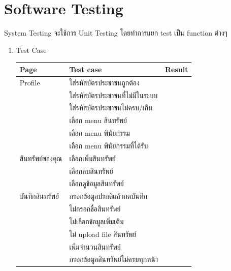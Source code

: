 \documentclass[12pt,oneside,openright,a4paper]{cpe-thai-project}
\begin{document}
\section{Software Testing}
\tab System Testing จะใช้การ Unit Testing โดยทำการแยก test เป็น function ต่างๆ
\begin{enumerate}[label=\thesection.\arabic*,leftmargin=0pt,itemindent=1.25cm]
\item Test Case
\begin{table}[h]
\begin{tabular}{|l|l|l|}
\hline
Page                   & Test case                                        &  Result \\ \hline
Profile                & ใส่รหัสบัตรประชาชนถูกต้อง                        &        \\ \hline
                       & ใส่รหัสบัตรประชาชนที่ไม่มีในระบบ                 &        \\ \hline
                       & ใส่รหัสบัตรประชาชนไม่ครบ/เกิน                    &        \\ \hline
                       & เลือก menu สินทรัพย์                             &        \\ \hline
                       & เลือก menu พินัยกรรม                             &        \\ \hline
                       & เลือก menu พินัยกรรมที่ได้รับ                    &        \\ \hline
สินทรัพย์ของคุณ        & เลือกเพิ่มสินทรัพย์                              &        \\ \hline
                       & เลือกลบสินทรัพย์                                 &        \\ \hline
                       & เลือกดูข้อมูลสินทรัพย์                           &        \\ \hline
บันทึกสินทรัพย์        & กรอกข้อมูลปรกติแล้วกดบันทึก                      &        \\ \hline
                       & ไม่กรอกชื่อสินทรัพย์                             &        \\ \hline
                       & ไม่เลือกข้อมูลเพิ่มเติม                          &        \\ \hline
                       & ไม่ upload file สินทรัพย์                        &        \\ \hline
                       & เพิ่มจำนวนสินทรัพย์                              &        \\ \hline
                       & กรอกข้อมูลสินทรัพย์ไม่ครบทุกหน้า                 &        \\ \hline

\end{tabular}
\end{table}
\end{enumerate}
\end{document}
